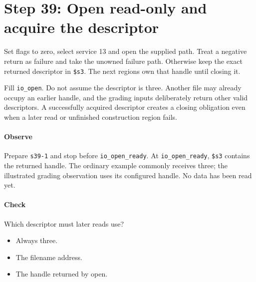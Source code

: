 \section{Step 39: Open read-only and acquire the descriptor}
Set flags to zero, select service 13 and open the supplied path. Treat a
negative return as failure and take the unowned failure path. Otherwise keep
the exact returned descriptor in \texttt{\$s3}. The next regions own that
handle until closing it.

Fill \texttt{io\_open}. Do not assume the descriptor is three. Another file
may already occupy an earlier handle, and the grading inputs deliberately return
other valid descriptors. A successfully acquired descriptor creates a closing
obligation even when a later read or unfinished construction region fails.

\paragraph{Observe} Prepare \texttt{s39-1} and stop before
\texttt{io\_open\_ready}. At \texttt{io\_open\_ready}, \texttt{\$s3} contains the
returned handle. The ordinary example commonly receives three; the illustrated
grading observation uses its configured handle. No data has been read yet.

\paragraph{Check} Which descriptor must later reads use?
\begin{itemize}
\item[A.] Always three.
\item[B.] The filename address.
\item[C.] The handle returned by open.
\end{itemize}
